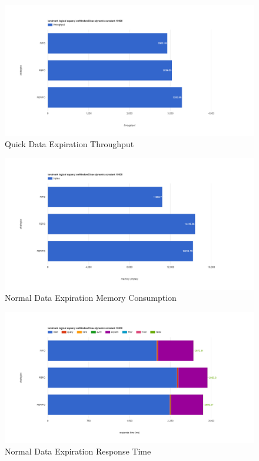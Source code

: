 \begin{figure}[!htbp]
	\centering
    \includegraphics[width=6.5in]{img/app3-ets-quick-t.png}
    \caption{Quick Data Expiration Throughput}
\end{figure}
\begin{figure}[!htbp]
	\centering
    \includegraphics[width=6.5in]{img/app3-ets-normal-m.png}
    \caption{Normal Data Expiration Memory Consumption}
\end{figure}
\begin{figure}[!htbp]
	\centering
    \includegraphics[width=6.5in]{img/app3-ets-normal-r.png}
    \caption{Normal Data Expiration Response Time}
\end{figure}
